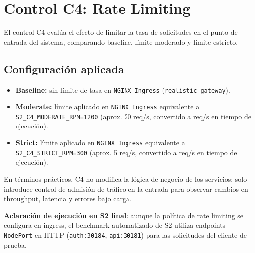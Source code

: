 
\section{Control C4: Rate Limiting}
\label{sec:c4-rate-limiting}

El control C4 eval\'ua el efecto de limitar la tasa de solicitudes en el punto de entrada del sistema, comparando baseline, l\'imite moderado y l\'imite estricto.

\subsection{Configuraci\'on aplicada}

\begin{itemize}
  \item \textbf{Baseline:} sin l\'imite de tasa en \texttt{NGINX Ingress} (\texttt{realistic-gateway}).

  \item \textbf{Moderate:} l\'imite aplicado en \texttt{NGINX Ingress} equivalente a \texttt{S2\_C4\_MODERATE\_RPM=1200} (aprox. 20 req/s, convertido a req/s en tiempo de ejecuci\'on).

  \item \textbf{Strict:} l\'imite aplicado en \texttt{NGINX Ingress} equivalente a \texttt{S2\_C4\_STRICT\_RPM=300} (aprox. 5 req/s, convertido a req/s en tiempo de ejecuci\'on).
\end{itemize}

En t\'erminos pr\'acticos, C4 no modifica la l\'ogica de negocio de los servicios; solo introduce control de admisi\'on de tr\'afico en la entrada para observar cambios en throughput, latencia y errores bajo carga.

\textbf{Aclaraci\'on de ejecuci\'on en S2 final:} aunque la pol\'itica de rate limiting se configura en ingress, el benchmark automatizado de S2 utiliza endpoints \texttt{NodePort} en HTTP (\texttt{auth:30184}, \texttt{api:30181}) para las solicitudes del cliente de prueba.
